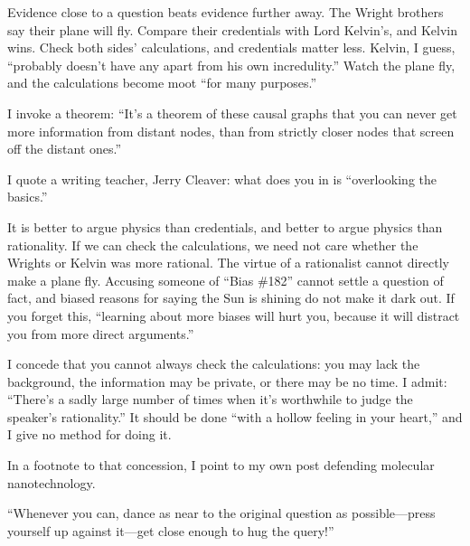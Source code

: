 
Evidence close to a question beats evidence further away. The Wright brothers say their plane will fly. Compare their credentials with Lord Kelvin's, and Kelvin wins. Check both sides' calculations, and credentials matter less. Kelvin, I guess, ``probably doesn't have any apart from his own incredulity.'' Watch the plane fly, and the calculations become moot ``for many purposes.''


I invoke a theorem: ``It's a theorem of these causal graphs that you can never get more information from distant nodes, than from strictly closer nodes that screen off the distant ones.'' 

I quote a writing teacher, Jerry Cleaver: what does you in is ``overlooking the basics.''

It is better to argue physics than credentials, and better to argue physics than rationality. If we can check the calculations, we need not care whether the Wrights or Kelvin was more rational. The virtue of a rationalist cannot directly make a plane fly. Accusing someone of ``Bias \#182'' cannot settle a question of fact, and biased reasons for saying the Sun is shining do not make it dark out. If you forget this, ``learning about more biases will hurt you, because it will distract you from more direct arguments.''

I concede that you cannot always check the calculations: you may lack the background, the information may be private, or there may be no time. I admit: ``There's a sadly large number of times when it's worthwhile to judge the speaker's rationality.'' It should be done ``with a hollow feeling in your heart,'' and I give no method for doing it. 

In a footnote to that concession, I point to my own post defending molecular nanotechnology. 

``Whenever you can, dance as near to the original question as possible---press yourself up against it---get close enough to hug the query!''
